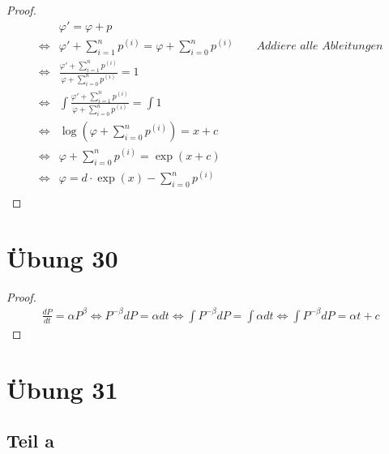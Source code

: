 \documentclass[10pt,a4paper]{article}
\begin{document}
\begin{proof}
\begin{align*}
& \varphi' = \varphi + p\\
\Leftrightarrow & \varphi' + \sum_{i = 1}^{n} p^{(i)} = \varphi + \sum_{i = 0}^{n} p^{(i)} \qquad \textit{Addiere alle Ableitungen}\\
\Leftrightarrow & \frac{\varphi' + \sum_{i = 1}^{n} p^{(i)}}{\varphi + \sum_{i = 0}^{n} p^{(i)}} = 1\\
\Leftrightarrow & \int \frac{\varphi' + \sum_{i = 1}^{n} p^{(i)}}{\varphi + \sum_{i = 0}^{n} p^{(i)}} = \int 1\\
\Leftrightarrow & \log(\varphi + \sum_{i = 0}^{n} p^{(i)}) = x + c\\
\Leftrightarrow & \varphi + \sum_{i = 0}^{n} p^{(i)} = \exp(x + c)\\
\Leftrightarrow & \varphi = d \cdot \exp(x) - \sum_{i = 0}^{n} p^{(i)}\\
\end{align*}
\end{proof}

\section*{Übung 30}

\begin{proof}
\begin{align*}
\frac{dP}{dt} = \alpha P^{\beta} \Leftrightarrow P^{-\beta} dP = \alpha dt \Leftrightarrow \int P^{-\beta} dP = \int \alpha dt \Leftrightarrow \int P^{-\beta} dP = \alpha t + c
\end{align*}
\end{proof}

\section*{Übung 31}

\subsection*{Teil a}
\end{document}
